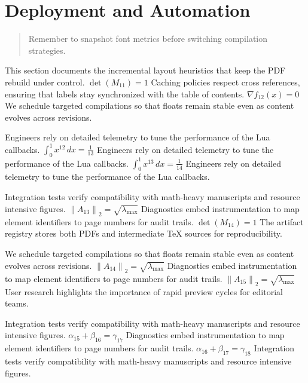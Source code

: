     \section{Deployment and Automation}
    
    \begin{quote}
      Remember to snapshot font metrics before switching compilation strategies.
    \end{quote}
  
    This section documents the incremental layout heuristics that keep the PDF rebuild under control.  $\det(M_{11}) = 1$  Caching policies respect cross references, ensuring that labels stay synchronized with the table of contents.  $\nabla f_{12}(x) = 0$  We schedule targeted compilations so that floats remain stable even as content evolves across revisions.
    \par
  
    Engineers rely on detailed telemetry to tune the performance of the Lua callbacks.  $\int_{0}^{1} x^{12} \, dx = \frac{1}{13}$  Engineers rely on detailed telemetry to tune the performance of the Lua callbacks.  $\int_{0}^{1} x^{13} \, dx = \frac{1}{14}$  Engineers rely on detailed telemetry to tune the performance of the Lua callbacks.
    \par
  
    Integration tests verify compatibility with math-heavy manuscripts and resource intensive figures.  $\left\|A_{13}\right\|_{2} = \sqrt{\lambda_{\max}}$  Diagnostics embed instrumentation to map element identifiers to page numbers for audit trails.  $\det(M_{14}) = 1$  The artifact registry stores both PDFs and intermediate TeX sources for reproducibility.
    \par
  
    We schedule targeted compilations so that floats remain stable even as content evolves across revisions.  $\left\|A_{14}\right\|_{2} = \sqrt{\lambda_{\max}}$  Diagnostics embed instrumentation to map element identifiers to page numbers for audit trails.  $\left\|A_{15}\right\|_{2} = \sqrt{\lambda_{\max}}$  User research highlights the importance of rapid preview cycles for editorial teams.
    \par
  
    Integration tests verify compatibility with math-heavy manuscripts and resource intensive figures.  $\alpha_{15} + \beta_{16} = \gamma_{17}$  Diagnostics embed instrumentation to map element identifiers to page numbers for audit trails.  $\alpha_{16} + \beta_{17} = \gamma_{18}$  Integration tests verify compatibility with math-heavy manuscripts and resource intensive figures.
    \par
  
